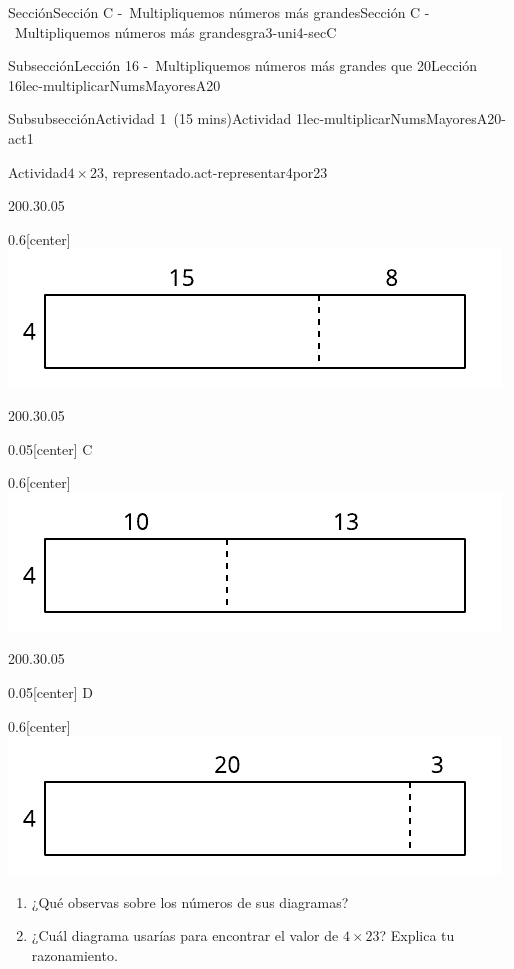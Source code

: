 \documentclass[oneside,10pt,]{article}
\begin{document}
\begin{sectionptx}{Sección}{Sección C -~Multipliquemos números más grandes}{}{Sección C -~Multipliquemos números más grandes}{}{}{gra3-uni4-secC}
\begin{subsectionptx}{Subsección}{Lección 16 -~Multipliquemos números más grandes que 20}{}{Lección 16}{}{}{lec-multiplicarNumsMayoresA20}
\begin{subsubsectionptx}{Subsubsección}{Actividad 1~(15 mins)}{}{Actividad 1}{}{}{lec-multiplicarNumsMayoresA20-act1}
\begin{activity}{Actividad}{\(4\times 23\), representado.}{act-representar4por23}
\begin{enumerate}
\begin{sidebyside}{2}{0}{0.3}{0.05}
\begin{sbspanel}{0.6}[center]
\includegraphics[width=\linewidth]{external/svg-source/tikz-file-152972-scale13.pdf}
\end{sbspanel}%
\end{sidebyside}%
\begin{sidebyside}{2}{0}{0.3}{0.05}%
\begin{sbspanel}{0.05}[center]%
C%
\end{sbspanel}%
\begin{sbspanel}{0.6}[center]%
\includegraphics[width=\linewidth]{external/svg-source/tikz-file-152973-scale13.pdf}
\end{sbspanel}%
\end{sidebyside}%
\begin{sidebyside}{2}{0}{0.3}{0.05}%
\begin{sbspanel}{0.05}[center]%
D%
\end{sbspanel}%
\begin{sbspanel}{0.6}[center]%
\includegraphics[width=\linewidth]{external/svg-source/tikz-file-152974-scale13.pdf}
\end{sbspanel}%
\end{sidebyside}%
%
\begin{enumerate}
\item{}¿Qué observas sobre los números de sus diagramas?%
\item{}¿Cuál diagrama usarías para encontrar el valor de \(4\times 23\)? Explica tu razonamiento.%

\end{enumerate}
\end{enumerate}
\end{activity}
\end{subsubsectionptx}
\end{subsectionptx}
\end{sectionptx}
\end{document}
